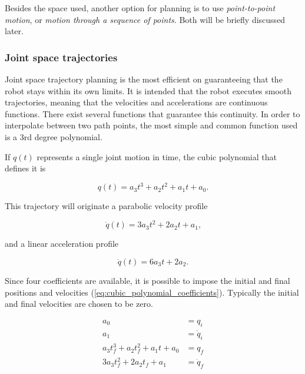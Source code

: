 Besides the space used, another option for planning is to use \emph{point-to-point motion}, or \emph{motion through a sequence of points}. Both will be briefly discussed later.

\subsubsection{Joint space trajectories}
\label{subsubsec:joint_space_trajectories}

Joint space trajectory planning is the most efficient on guaranteeing that the robot stays within its own limits. It is intended that the robot executes smooth trajectories, meaning that the velocities and accelerations are continuous functions. There exist several functions that guarantee this continuity. In order to interpolate between two path points, the most simple and common function used is a 3rd degree polynomial.

If $q(t)$ represents a single joint motion in time, the cubic polynomial that defines it is

\begin{equation}
    q(t) = a_3 t^3 + a_2 t^2 + a_1 t + a_0 \text{.}
\end{equation}

This trajectory will originate a parabolic velocity profile

\begin{equation}
    \dot{q}(t) = 3 a_3 t^2 + 2 a_2 t + a_1\text{,}
\end{equation}

and a linear acceleration profile

\begin{equation}
    \ddot{q}(t) = 6 a_3 t + 2 a_2\text{.}
\end{equation}

Since four coefficients are available, it is possible to impose the initial and final positions and velocities (\ref{eq:cubic_polynomial_coefficients}). Typically the initial and final velocities are chosen to be zero.

\begin{equation}
    \label{eq:cubic_polynomial_coefficients}
    \begin{aligned}
        a_0 &= q_i\\
        a_1 &= \dot{q}_i \\
        a_3 t_f^3 + a_2 t_f^2 + a_1 t + a_0 &= q_f \\
        3 a_3 t_f^2 + 2 a_2 t_f + a_1 &= \dot{q}_f 
    \end{aligned}
\end{equation}

